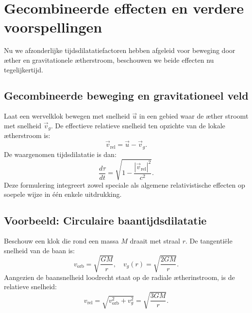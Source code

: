 \section{Gecombineerde effecten en verdere voorspellingen}

Nu we afzonderlijke tijdsdilatatiefactoren hebben afgeleid voor beweging door æther en gravitationele ætherstroom, beschouwen we beide effecten nu tegelijkertijd.

\subsection*{Gecombineerde beweging en gravitationeel veld}

Laat een wervelklok bewegen met snelheid $\vec{u}$ in een gebied waar de æther stroomt met snelheid $\vec{v}_g$. De effectieve relatieve snelheid ten opzichte van de lokale ætherstroom is:
\[
    \vec{v}_{\text{rel}} = \vec{u} - \vec{v}_g.
\]
De waargenomen tijdsdilatatie is dan:
\[
    \frac{d\tau}{dt} = \sqrt{1 - \frac{|\vec{v}_{\text{rel}}|^2}{c^2}}. \tag{5}
\]
Deze formulering integreert zowel speciale als algemene relativistische effecten op soepele wijze in één enkele uitdrukking.

\subsection*{Voorbeeld: Circulaire baantijdsdilatatie}

Beschouw een klok die rond een massa $M$ draait met straal $r$. De tangentiële snelheid van de baan is:
\[
    v_{\text{orb}} = \sqrt{\frac{GM}{r}}, \quad v_g(r) = \sqrt{\frac{2GM}{r}}.
\]
Aangezien de baansnelheid loodrecht staat op de radiale ætherinstroom, is de relatieve snelheid:
\[
    v_{\text{rel}} = \sqrt{v_{\text{orb}}^2 + v_g^2} = \sqrt{\frac{3GM}{r}}.
\]

